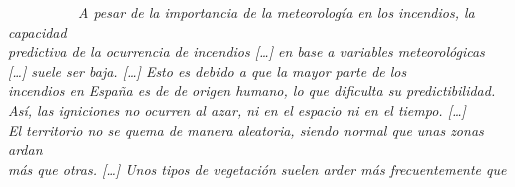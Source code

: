 \documentclass[12pt,a4paper,]{book}
\numberwithin{dummy}{section}
\theoremstyle{ocrenumbox}
\theoremstyle{blacknumex}
\theoremstyle{blacknumbox}
\theoremstyle{ocrenum}
\theoremstyle{ocrenum}
\begin{document}
~~~~~~~~~~\emph{A pesar de la importancia de la meteorología en los
incendios, la capacidad }\\
\hspace*{0.333em}\hspace*{0.333em}\hspace*{0.333em}\hspace*{0.333em}\hspace*{0.333em}\hspace*{0.333em}\emph{predictiva
de la ocurrencia de incendios {[}\ldots{]} en base a variables
meteorológicas}\\
\hspace*{0.333em}\hspace*{0.333em}\hspace*{0.333em}\hspace*{0.333em}\hspace*{0.333em}\hspace*{0.333em}\emph{{[}\ldots{]}
suele ser baja. {[}\ldots{]} Esto es debido a que la mayor parte de los
}\\
\hspace*{0.333em}\hspace*{0.333em}\hspace*{0.333em}\hspace*{0.333em}\hspace*{0.333em}\hspace*{0.333em}\emph{incendios
en España es de de origen humano, lo que dificulta su
predictibilidad.}\\
\hspace*{0.333em}\hspace*{0.333em}\hspace*{0.333em}\hspace*{0.333em}\hspace*{0.333em}\hspace*{0.333em}\emph{Así,
las igniciones no ocurren al azar, ni en el espacio ni en el tiempo.
{[}\ldots{]} }\\
\hspace*{0.333em}\hspace*{0.333em}\hspace*{0.333em}\hspace*{0.333em}\hspace*{0.333em}\hspace*{0.333em}\emph{El
territorio no se quema de manera aleatoria, siendo normal que unas zonas
ardan}\\
\hspace*{0.333em}\hspace*{0.333em}\hspace*{0.333em}\hspace*{0.333em}\hspace*{0.333em}\hspace*{0.333em}\emph{más
que otras. {[}\ldots{]} Unos tipos de vegetación suelen arder más
frecuentemente que }\\
\end{document}
